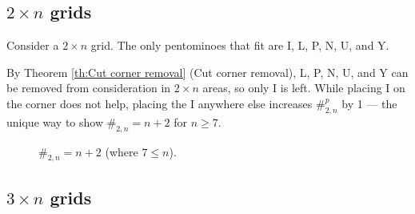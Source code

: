 \documentclass{article}
\theoremstyle{definition}%
\begin{document}
\subsection{\texorpdfstring{$2 \times n$}{2 \texttimes n} grids}

Consider a $2 \times n$ grid. The only pentominoes that fit are I, L, P, N, U, and Y.

By Theorem \ref{th:Cut corner removal} (Cut corner removal), L, P, N, U, and Y can be removed from consideration in $2 \times n$ areas, so only I is left. While placing I on the corner does not help, placing the I anywhere else increases $\#^p_{2, n}$ by 1 --- the unique way to show $\#_{2, n} = n + 2$ for $n \ge 7$.

\begin{figure}[htbp!]
    \centering
    \caption{$\#_{2, n} = n + 2$ (where $7 \le n$). \cite{sheet}}
\end{figure}

\subsection{\texorpdfstring{$3 \times n$}{3 \texttimes n} grids}
\end{document}
